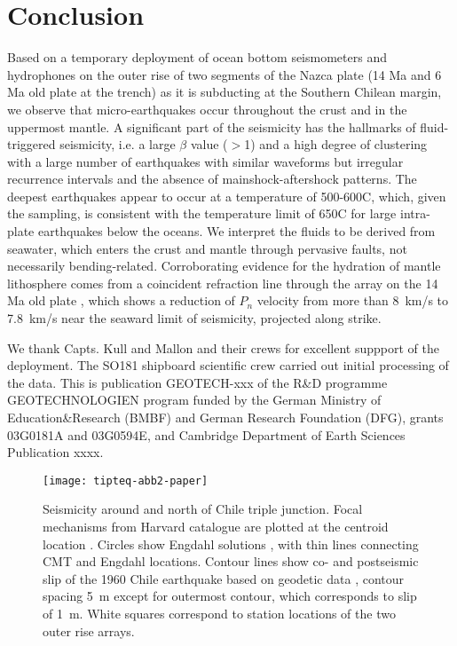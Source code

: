 \documentclass[reviewcopy]{elsart}
\renewcommand{\includegraphics}[2][]{\fbox{#2}}
\begin{document}
\section{Conclusion}

Based on a temporary deployment of ocean bottom seismometers and
hydrophones on the outer rise of two segments of the Nazca plate  (14 Ma and 6 Ma old plate at the trench) as
it is subducting at the Southern Chilean margin, we observe that
micro-earthquakes occur throughout the crust and in the uppermost
mantle.  A significant part of
the seismicity has the hallmarks of fluid-triggered seismicity,
i.e. a large $\beta$ value ($>$1) and a high degree of clustering with a
large number of earthquakes with similar waveforms but irregular
recurrence intervals and the absence of mainshock-aftershock
patterns. The deepest earthquakes appear to occur at a temperature of
500-600\dg C, which, given the sampling, is consistent with the
temperature limit of 650\dg C for large intra-plate earthquakes below
the oceans. 
We interpret the fluids to be derived from seawater, which enters the
crust and mantle through pervasive faults, not necessarily
bending-related.  Corroborating evidence for the hydration of mantle lithosphere
comes from a coincident refraction line through the array on the 14 Ma
old plate \citep{contreras-reyes07},
which shows a reduction of $P_n$ velocity from more than 8~km/s to 7.8~km/s
near the seaward limit of seismicity, projected along strike.




\ack
We thank  
Capts. Kull and Mallon and their crews for excellent suppport of the deployment.
The SO181 shipboard scientific crew carried out initial processing of
the data.  
This is publication GEOTECH-xxx of the R\&D programme GEOTECHNOLOGIEN program funded by
the German Ministry of Education\&Research (BMBF) and German Research
Foundation (DFG), grants 03G0181A and 03G0594E,  and Cambridge Department of Earth Sciences Publication xxxx. 





\begin{figure}
\centering
\texttt{[image: tipteq-abb2-paper]}
\caption{Seismicity around and north of Chile triple junction. Focal
  mechanisms from Harvard catalogue are plotted at the centroid location \citep{dziewonski81a}. Circles show Engdahl
  solutions \citep{engdahl98}, with thin lines connecting CMT and Engdahl locations.  Contour lines show co- and
  postseismic slip of the 1960 Chile earthquake based on geodetic data
  \citep{barrientos90}, contour spacing 5~m except for outermost
  contour, which corresponds to slip of 1~m.  White squares correspond
to station locations of the two outer rise arrays.}
\label{fig:overview-map}

\end{figure}
\end{document}
